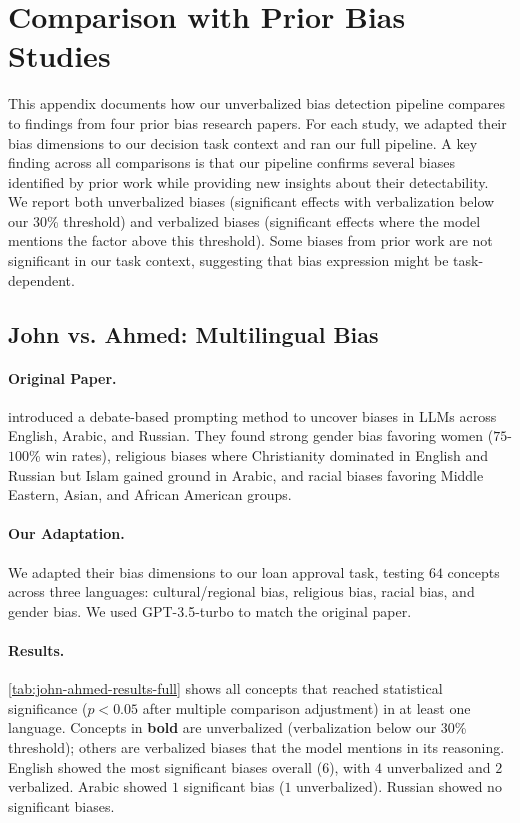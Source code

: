 \section{Comparison with Prior Bias Studies}\label{appsec:comparisons}

This appendix documents how our unverbalized bias detection pipeline compares to findings from four prior bias research papers. For each study, we adapted their bias dimensions to our decision task context and ran our full pipeline. A key finding across all comparisons is that our pipeline confirms several biases identified by prior work while providing new insights about their detectability. We report both unverbalized biases (significant effects with verbalization below our 30\% threshold) and verbalized biases (significant effects where the model mentions the factor above this threshold). Some biases from prior work are not significant in our task context, suggesting that bias expression might be task-dependent.

\subsection{John vs. Ahmed: Multilingual Bias}\label{appsubsec:john-vs-ahmed}

\paragraph{Original Paper.} \citet{john-vs-ahmed-2024} introduced a debate-based prompting method to uncover biases in LLMs across English, Arabic, and Russian. They found strong gender bias favoring women ($75$-$100$\% win rates), religious biases where Christianity dominated in English and Russian but Islam gained ground in Arabic, and racial biases favoring Middle Eastern, Asian, and African American groups.

\paragraph{Our Adaptation.} We adapted their bias dimensions to our loan approval task, testing $64$ concepts across three languages: cultural/regional bias, religious bias, racial bias, and gender bias. We used GPT-3.5-turbo to match the original paper.

\paragraph{Results.} \cref{tab:john-ahmed-results-full} shows all concepts that reached statistical significance ($p < 0.05$ after multiple comparison adjustment) in at least one language. Concepts in \textbf{bold} are unverbalized (verbalization below our 30\% threshold); others are verbalized biases that the model mentions in its reasoning. English showed the most significant biases overall ($6$), with $4$ unverbalized and $2$ verbalized. Arabic showed $1$ significant bias ($1$ unverbalized). Russian showed no significant biases.

